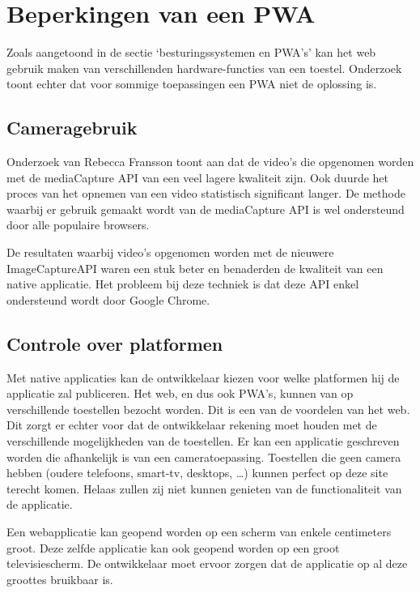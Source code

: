 \section{Beperkingen van een PWA}

Zoals aangetoond in de sectie ‘besturingssystemen en PWA’s’ kan het web gebruik maken van verschillenden hardware-functies van een toestel. Onderzoek toont echter dat voor sommige toepassingen een PWA niet de oplossing is.
\autocite{Malavolta2016}


\subsection{Cameragebruik}
	Onderzoek van Rebecca Fransson toont aan dat de video’s die opgenomen worden met de mediaCapture API van een veel lagere kwaliteit zijn. Ook duurde het proces van het opnemen van een video statistisch significant langer. De methode waarbij er gebruik gemaakt wordt van de mediaCapture API is wel ondersteund door alle populaire browsers.
	
	De resultaten waarbij video’s opgenomen worden met de nieuwere ImageCaptureAPI waren een stuk beter en benaderden de kwaliteit van een native applicatie. Het probleem bij deze techniek is dat deze API enkel ondersteund wordt door Google Chrome.
	\autocite{Fransson2017}
	

\subsection{Controle over platformen}
	
	Met native applicaties kan de ontwikkelaar kiezen voor welke platformen hij de applicatie zal publiceren. Het web, en dus ook PWA’s, kunnen van op verschillende toestellen bezocht worden. Dit is een van de voordelen van het web. Dit zorgt er echter voor dat de ontwikkelaar rekening moet houden met de verschillende mogelijkheden van de toestellen. Er kan een applicatie geschreven worden die afhankelijk is van een cameratoepassing. Toestellen die geen camera hebben (oudere telefoons, smart-tv, desktops, …) kunnen perfect op deze site terecht komen. Helaas zullen zij niet kunnen genieten van de functionaliteit van de applicatie.
	
	Een webapplicatie kan geopend worden op een scherm van enkele centimeters groot. Deze zelfde applicatie kan ook geopend worden op een groot televisiescherm. De ontwikkelaar moet ervoor zorgen dat de applicatie op al deze groottes bruikbaar is.
	
